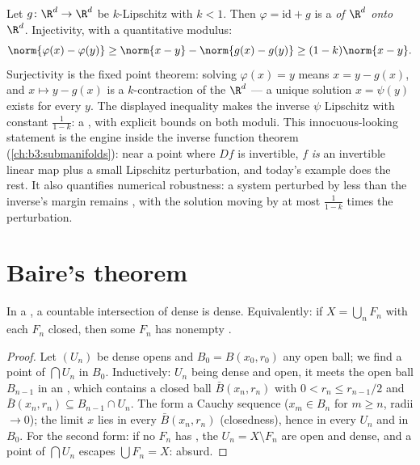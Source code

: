 \begin{example}
\label{ex:b3:complete:perturbident}
Let $g \colon \R^d \to \R^d$ be $k$-Lipschitz with $k < 1$.
Then $\varphi = \mathrm{id} + g$ is a \emph{ of
$\R^d$ onto $\R^d$}. Injectivity, with a quantitative
modulus:
\[
\norm{\varphi(x) - \varphi(y)} \geq \norm{x - y} -
\norm{g(x) - g(y)} \geq (1 - k)\norm{x - y} .
\]
Surjectivity is the fixed point theorem: solving
$\varphi(x) = y$ means $x = y - g(x)$, and $x \mapsto y -
g(x)$ is a $k$-contraction of the  $\R^d$ --- a
unique solution $x = \psi(y)$ exists for every $y$. The
displayed inequality makes the inverse $\psi$ Lipschitz with
constant $\frac1{1-k}$: a , with explicit
bounds on both moduli. This innocuous-looking statement is
the engine inside the inverse function theorem
(\cref{ch:b3:submanifolds}): near a point where $Df$ is
invertible, $f$ \emph{is} an invertible linear map plus a
small Lipschitz perturbation, and today's example does the
rest. It also quantifies numerical robustness: a system
perturbed by less than the inverse's margin remains
, with the solution moving by at most
$\frac{1}{1-k}$ times the perturbation.
\end{example}

\section{Baire's theorem}

\begin{theorem}[Baire]\label{thm:b3:complete:baire}
In a , a countable intersection of dense
 is dense. Equivalently: if $X = \bigcup_{n}F_n$ with
each $F_n$ closed, then some $F_n$ has nonempty
.
\end{theorem}

\begin{proof}
Let $(U_n)$ be dense opens and $B_0 = B(x_0, r_0)$ any open
ball; we find a point of $\bigcap U_n$ in $B_0$. Inductively:
$U_{n}$ being dense and open, it meets the open ball $B_{n-1}$
in an , which contains a closed ball $\bar B(x_n, r_n)$
with $0 < r_n \leq r_{n-1}/2$ and $\bar B(x_n, r_n) \subseteq
B_{n-1}\cap U_n$. The  form a Cauchy sequence ($x_m \in
B_n$ for $m \geq n$, radii $\to 0$); the limit $x$ lies in
every $\bar B(x_n, r_n)$ (closedness), hence in every $U_n$ and
in $B_0$. For the second form: if no $F_n$ has , the
$U_n = X \setminus F_n$ are open and dense, and a point of
$\bigcap U_n$ escapes $\bigcup F_n = X$: absurd.
\end{proof}


